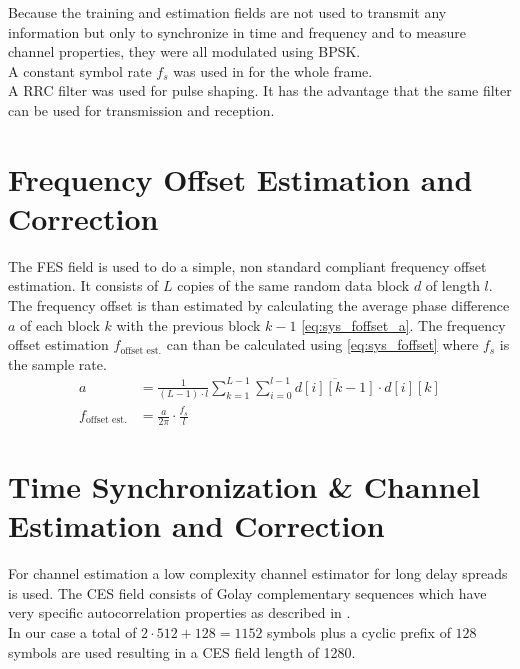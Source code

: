 Because the training and estimation fields are not used to
transmit any information but only to synchronize in time
and frequency and to measure channel properties, they were all
modulated using \gls{BPSK}. \\

A constant symbol rate $f_s$ was used in for the whole frame. \\

A \gls{RRC} filter was used for pulse shaping. It has the advantage that
the same filter can be used for transmission and reception. \\

\section{Frequency Offset Estimation and Correction}
\label{sec:sys_fes}
The \gls{FES} field is used to do a simple, non standard compliant frequency
offset estimation. It consists of $L$ copies of the same random data block $d$
of length $l$.
The frequency offset is than estimated by calculating the average phase
difference $a$ of each block $k$ with the previous block $k - 1$
\eqref{eq:sys_foffset_a}. The frequency offset estimation
$f_{\text{offset est.}}$ can than be calculated using \eqref{eq:sys_foffset}
where $f_s$ is the sample rate. \\

\begin{subequations}
  \begin{alignat}{2}
    a &= \frac{1}{(L-1) \cdot l}
    \sum_{k=1}^{L-1} \sum_{i=0}^{l-1} \overline{d[i][k-1]} \cdot d[i][k]
    \label{eq:sys_foffset_a} \\
    f_{\text{offset est.}} &= \frac{a}{2 \pi} \cdot \frac{f_s}{l}
    \label{eq:sys_foffset}
  \end{alignat}
\end{subequations}

\section{Time Synchronization \& Channel Estimation and Correction}
\label{sec:sys_ces}
For channel estimation a low complexity channel estimator for long delay
spreads is used.
The \gls{CES} field consists of Golay complementary sequences which
have very specific autocorrelation properties as described in \cite{golay}. \\

In our case a total of $2 \cdot 512 + 128 = 1152$ symbols plus
a cyclic prefix of $128$ symbols are used resulting in a \gls{CES} field
length of 1280. \\

